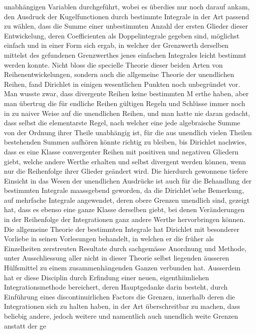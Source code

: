 \documentclass[11pt]{article}
\begin{document}
\noindent unabhängigen Variablen durchgeführt, wobei es überdies nur noch darauf ankam, den Ausdruck der Kugelfunctionen durch bestimmte Integrale in der Art passend zu wählen, dass die Summe einer unbestimmten Anzahl der ersten Glieder dieser Entwickelung, deren Coefficienten als Doppelintegrale gegeben sind, möglichst einfach und in einer Form sich ergab, in welcher der Grenzwerth derselben mittelst des gefundenen Grenzwerthes jenes einfachen Integrales leicht bestimmt werden konnte. Nicht bloss die specielle Theorie dieser beiden Arten von Reihenentwickelungen, sondern auch die allgemeine Theorie der unendlichen Reihen, fand Dirichlet in einigen wesentlichen Punkten noch unbegründet vor. Man wusste zwar, dass divergente Reihen keine bestimmten M erthe haben, aber man übertrug die für endliche Reihen gültigen Regeln und Schlüsse immer noch in zu naiver Weise auf die unendlichen Reihen, und man hatte nie daran gedacht, dass selbst die elementarste Regel, nach welcher eine jede algebraische Summe von der Ordnung ihrer Theile unabhängig ist, für die aus unendlich vielen Theilen bestehenden Summen aufhören könnte richtig zu bleiben, bis Dirichlet nachwies, dass es eine Klasse convergenter Reihen mit positiven und negativen Gliedern giebt, welche andere Werthe erhalten und selbst divergent werden können, wenn nur die Reihenfolge ihrer Glieder geändert wird. Die hierdurch gewonnene tiefere Einsicht in das Wesen der unendlichen Ausdrücke ist auch für die Behandlung der bestimmten Integrale maassgebend geworden, da die Dirichlet’sehe Bemerkung, auf mehrfache Integrale angewendet, deren obere Grenzen unendlich sind, gezeigt hat, dass es ebenso eine ganze Klasse derselben giebt, bei denen Veränderungen in der Reihenfolge der Integrationen ganz andere Werthe hervorbringen können. Die allgemeine Theorie der bestimmten Integrale hat Dirichlet mit besonderer Vorliebe in seinen Vorlesungen behandelt, in welchen er die früher als Einzelheiten zerstreuten Resultate durch sachgemässe Anordnung und Methode, unter Ausschliessung aller nicht in dieser Theorie selbst liegenden äusseren Hülfsmittel zu einem zusammenhängenden Ganzen verbunden hat. Ausserdem hat er diese Disciplin durch Erfindung einer neuen, eigenthiimliehen Integrationsmethode bereichert, deren Hauptgedanke darin besteht, durch Einführung eines discontinuirlichen Factors die Grenzen, innerhalb deren die Integrationen sich zu halten haben, in der Art überschreitbar zu machen, dass beliebig andere, jedoch weitere und namentlich auch unendlich weite Grenzen anstatt der ge
\par
\end{document}
